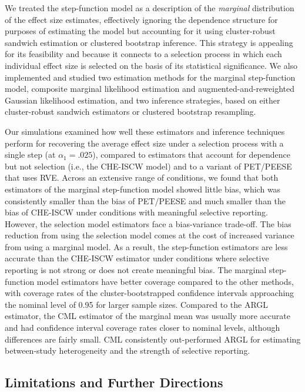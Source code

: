 \documentclass[
  man, donotrepeattitle,floatsintext]{apa7}
\begin{document}
We treated the step-function model as a description of the \emph{marginal} distribution of the effect size estimates, effectively ignoring the dependence structure for purposes of estimating the model but accounting for it using cluster-robust sandwich estimation or clustered bootstrap inference.
This strategy is appealing for its feasibility and because it connects to a selection process in which each individual effect size is selected on the basis of its statistical significance.
We also implemented and studied two estimation methods for the marginal step-function model, composite marginal likelihood estimation and augmented-and-reweighted Gaussian likelihood estimation, and two inference strategies, based on either cluster-robust sandwich estimators or clustered bootstrap resampling.

Our simulations examined how well these estimators and inference techniques perform for recovering the average effect size under a selection process with a single step (at \(\alpha_1 = .025\)), compared to estimators that account for dependence but not selection (i.e., the CHE-ISCW model) and to a variant of PET/PEESE that uses RVE.
Across an extensive range of conditions, we found that both estimators of the marginal step-function model showed little bias, which was consistently smaller than the bias of PET/PEESE and much smaller than the bias of CHE-ISCW under conditions with meaningful selective reporting.
However, the selection model estimators face a bias-variance trade-off.
The bias reduction from using the selection model comes at the cost of increased variance from using a marginal model. As a result, the step-function estimators are less accurate than the CHE-ISCW estimator under conditions where selective reporting is not strong or does not create meaningful bias.
The marginal step-function model estimators have better coverage compared to the other methods, with coverage rates of the cluster-bootstrapped confidence intervals approaching the nominal level of 0.95 for larger sample sizes.
Compared to the ARGL estimator, the CML estimator of the marginal mean was usually more accurate and had confidence interval coverage rates closer to nominal levels, although differences are fairly small.
CML consistently out-performed ARGL for estimating between-study heterogeneity and the strength of selective reporting.

\subsection{Limitations and Further Directions}\label{limitations-and-further-directions}
\end{document}
